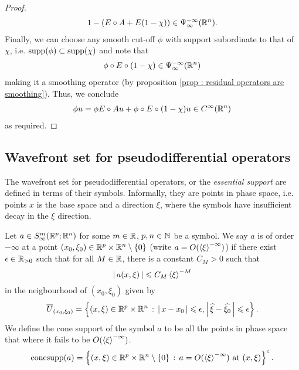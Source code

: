 \documentclass[12pt]{article}
\begin{document}
\begin{proof}
\begin{align*}
        1 - (E \circ A + E (1 - \chi)) \in \Psi^{-\infty}_\infty(\R^n). 
    \end{align*}
    Finally, we can choose any smooth cut-off $\phi$ with support subordinate to that of $\chi$, i.e. $\supp(\phi) \subset \supp(\chi)$ and note that 
    \begin{align*}
        \phi \circ E \circ (1 - \chi) \in \Psi^{-\infty}_\infty(\R^n)
    \end{align*}
    making it a smoothing operator (by proposition \ref{prop : residual operators are smoothing}). Thus, we conclude 
    \begin{align*}
        \phi u = \phi E \circ A u + \phi \circ E \circ (1 - \chi) u \in C^\infty(\R^n)
    \end{align*}
    as required. 
    
    
    
    
\end{proof}

\subsection{Wavefront set for pseudodifferential operators}
The wavefront set for pseudodifferential operators, or the \textit{essential support} are defined in terms of their symbols. Informally, they are points in phase space, i.e. points $x$ is the base space and a direction $\xi$,  where the symbols have insufficient decay in the $\xi$ direction. 

\begin{fdefinition}
    Let $a \in S^{m}_\infty(\R^{p}; \R^n)$ for some $m \in \R$, $p, n \in \N$ be a symbol. We say $a$ is of order $-\infty$ at a point $(x_0, \xi_0) \in \R^p \times \R^n \setminus \set{0}$ (write $a = O(\sym[\xi]^{-\infty})$) if there exist $\epsilon \in \R_{> 0}$ such that for all $M \in \R$, there is a constant $C_M > 0$ such that 
    \[
    \abs{a(x, \xi)} \leq C_M \sym[\xi]^{-M}
    \]
    in the neigbourhood of $(x_0, \xi_0)$ given by
    \[
    \overline{U}_{(x_0, \xi_0)} = \set{(x, \xi) \in \R^p \times \R^n \wh \abs{x - x_0} \leq \epsilon, \abs{\widehat{\xi} - \widehat{\xi_0}} \leq \epsilon}. 
    \]
    We define the cone support of the symbol $a$ to be all the points in phase space that where it fails to be $O(\sym[\xi]^{-\infty})$. 
    \[
    \mathrm{conesupp}(a) = \set{(x, \xi) \in \R^p \times \R^n \setminus \set{0} \wh a = O(\sym[\xi]^{-\infty}) \text{ at } (x, \xi)}^c. 
    \]
\end{fdefinition}
\end{document}
